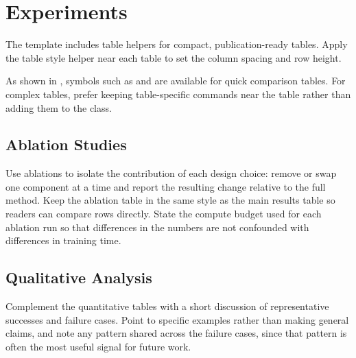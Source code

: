 \section{Experiments}

The template includes table helpers for compact, publication-ready tables.
Apply the table style helper near each table to set the column spacing and
row height.



As shown in , symbols such as \texttt{\string\cmark} and
\texttt{\string\xmark} are available for quick comparison tables. For complex
tables, prefer keeping table-specific commands near the table rather than adding
them to the class.

\subsection{Ablation Studies}

Use ablations to isolate the contribution of each design choice: remove or
swap one component at a time and report the resulting change relative to the
full method. Keep the ablation table in the same style as the main results
table so readers can compare rows directly. State the compute budget used for
each ablation run so that differences in the numbers are not confounded with
differences in training time.

\subsection{Qualitative Analysis}

Complement the quantitative tables with a short discussion of representative
successes and failure cases. Point to specific examples rather than making
general claims, and note any pattern shared across the failure cases, since
that pattern is often the most useful signal for future work.
